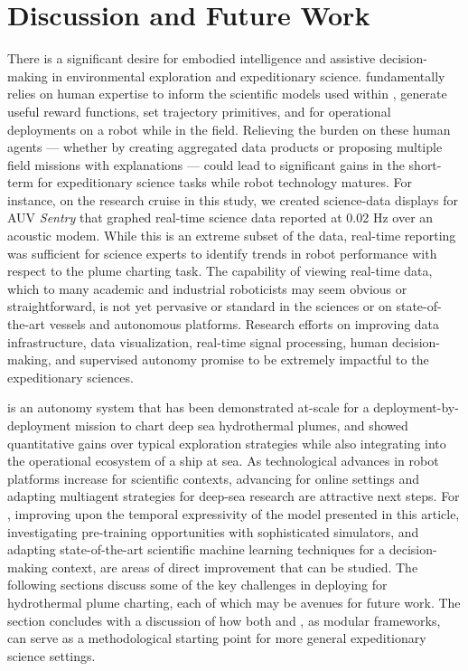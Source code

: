 \section{Discussion and Future Work}
\label{sec:future}
There is a significant desire for embodied intelligence and assistive decision-making in environmental exploration and expeditionary science. \PHORTEX fundamentally relies on human expertise to inform the scientific models used within \PHUMES, generate useful reward functions, set trajectory primitives, and for operational deployments on a robot while in the field. Relieving the burden on these human agents --- whether by creating aggregated data products or proposing multiple field missions with explanations --- could lead to significant gains in the short-term for expeditionary science tasks while robot technology matures. For instance, on the research cruise in this study, we created science-data displays for AUV \emph{Sentry} that graphed real-time science data reported at 0.02 Hz over an acoustic modem. While this is an extreme subset of the data, real-time reporting was sufficient for science experts to identify trends in robot performance with respect to the plume charting task. The capability of viewing real-time data, which to many academic and industrial roboticists may seem obvious or straightforward, is not yet pervasive or standard in the sciences or on state-of-the-art vessels and autonomous platforms. Research efforts on improving data infrastructure, data visualization, real-time signal processing, human decision-making, and supervised autonomy promise to be extremely impactful to the expeditionary sciences. 

\PHORTEX is an autonomy system that has been demonstrated at-scale for a deployment-by-deployment mission to chart deep sea hydrothermal plumes, and showed quantitative gains over typical exploration strategies while also integrating into the operational ecosystem of a ship at sea. As technological advances in robot platforms increase for scientific contexts, advancing \PHORTEX for online settings and adapting multiagent strategies for deep-sea research are attractive next steps. For \PHUMES, improving upon the temporal expressivity of the model presented in this article, investigating pre-training opportunities with sophisticated simulators, and adapting state-of-the-art scientific machine learning techniques for a decision-making context, are areas of direct improvement that can be studied. The following sections discuss some of the key challenges in deploying \PHORTEX for hydrothermal plume charting, each of which may be avenues for future work. The section concludes with a discussion of how both \PHORTEX and \PHUMES, as modular frameworks, can serve as a methodological starting point for more general expeditionary science settings.


